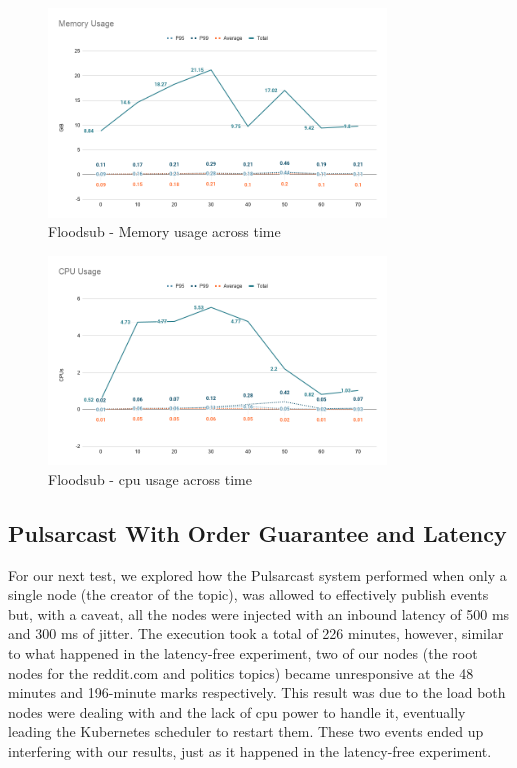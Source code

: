 \begin{figure}[!htb]
  \centering
  \includegraphics[width=0.8\textwidth]{../images/graph-floodsub-memory.png}
  \caption{Floodsub - Memory usage across time}
  \label{fig:graph-floodsub-memory}
\end{figure}

\begin{figure}[!htb]
  \centering
  \includegraphics[width=0.8\textwidth]{../images/graph-floodsub-cpu.png}
  \caption{Floodsub - \acrshort{cpu} usage across time}
  \label{fig:graph-floodsub-cpu}
\end{figure}

\subsection{Pulsarcast With Order Guarantee and Latency}\label{subsec:pulsarcast-with-order-guarantee-and-latency}

For our next test, we explored how the Pulsarcast system performed when only a
single node (the creator of the topic), was allowed to effectively publish
events but, with a caveat, all the nodes were injected with an inbound latency
of 500 ms and 300 ms of jitter. The execution took a total of 226 minutes,
however, similar to what happened in the latency-free experiment, two of our
nodes (the root nodes for the reddit.com and politics topics) became
unresponsive at the 48 minutes and 196-minute marks respectively. This result
was due to the load both nodes were dealing with and the lack of \acrshort{cpu} power to
handle it, eventually leading the Kubernetes scheduler to restart them. These
two events ended up interfering with our results, just as it happened in the
latency-free experiment.

